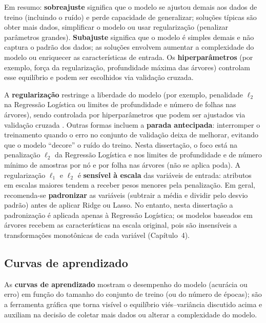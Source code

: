 Em resumo: \textbf{sobreajuste} significa que o modelo se ajustou demais aos dados de treino (incluindo o ruído) e perde capacidade de generalizar; soluções típicas são obter mais dados, simplificar o modelo ou usar regularização (penalizar parâmetros grandes). \textbf{Subajuste} significa que o modelo é simples demais e não captura o padrão dos dados; as soluções envolvem aumentar a complexidade do modelo ou enriquecer as características de entrada. Os \textbf{hiperparâmetros} (por exemplo, força da regularização, profundidade máxima das árvores) controlam esse equilíbrio e podem ser escolhidos via validação cruzada.

A \textbf{regularização} restringe a liberdade do modelo (por exemplo, penalidade \(\ell_2\) na Regressão Logística ou limites de profundidade e número de folhas nas árvores), sendo controlada por hiperparâmetros que podem ser ajustados via validação cruzada \citep{geron2019maos}. Outras formas incluem a \textbf{parada antecipada}: interromper o treinamento quando o erro no conjunto de validação deixa de melhorar, evitando que o modelo ``decore'' o ruído do treino. Nesta dissertação, o foco está na penalização $\ell_2$ da Regressão Logística e nos limites de profundidade e de número mínimo de amostras por nó e por folha nas árvores (não se aplica poda). A regularização \(\ell_1\) e \(\ell_2\) é \textbf{sensível à escala} das variáveis de entrada: atributos em escalas maiores tendem a receber pesos menores pela penalização. Em geral, recomenda-se \textbf{padronizar} as variáveis (subtrair a média e dividir pelo desvio padrão) antes de aplicar Ridge ou Lasso. No entanto, nesta dissertação a padronização é aplicada apenas à Regressão Logística; os modelos baseados em árvores recebem as características na escala original, pois são insensíveis a transformações monotônicas de cada variável (Capítulo~4).

\subsection{Curvas de aprendizado}
\label{sec:curvas_aprendizado}

As \textbf{curvas de aprendizado} mostram o desempenho do modelo (acurácia ou erro) em função do tamanho do conjunto de treino (ou do número de épocas); são a ferramenta gráfica que torna visível o equilíbrio viés--variância discutido acima e auxiliam na decisão de coletar mais dados ou alterar a complexidade do modelo.


